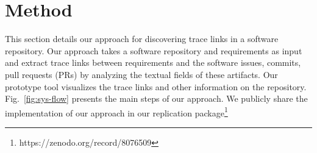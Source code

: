 \section{Method}
\label{sec:approach}

This section details our approach for discovering trace links in a software repository. Our approach takes a software repository and requirements as input and extract trace links between requirements and the software issues, commits, pull requests (PRs) by analyzing the textual fields of these artifacts. Our prototype tool visualizes the trace links and other information on the repository. Fig.~\ref{fig:sys-flow} presents the main steps of our approach. We publicly share the implementation of our approach in our replication package\footnote{https://zenodo.org/record/8076509}

